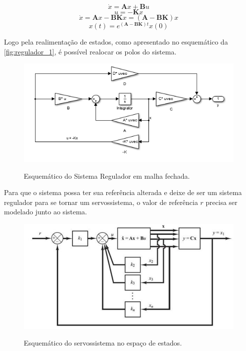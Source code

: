 \documentclass[
	article,			%
	11pt,				%
	oneside,			%
	a4paper,			%
	english,			%
	brazil,				%
	sumario=tradicional
	]{abntex2}
\begin{document}
$$
\dot x = \textbf{A}x + \textbf{B}u
$$
$$
u = -\textbf{K}x
$$
$$
\dot x = \textbf{A}x - \textbf{B}\textbf{K}x = (\textbf{A} - \textbf{B}\textbf{K})x
$$
$$
x(t)=e^{(\textbf{A}-\textbf{BK})t}x(0)
$$

Logo pela realimentação de estados, como apresentado no esquemático da \autoref{fig:regulador_1}, é possível realocar os polos do sistema.

\begin{figure}[htb!]
	\centering
	\caption{Esquemático do Sistema Regulador em malha fechada.}
	\includegraphics[scale=1]{./img/regulador_1.PNG}
	\label{fig:regulador_1}
\end{figure}

\pagebreak

Para que o sistema possa ter sua referência alterada e deixe de ser um sistema regulador para se tornar um servossistema, o valor de referência $r$ precisa ser modelado junto ao sistema.

\begin{figure}[htb!]
	\centering
	\caption{Esquemático do servossistema no espaço de estados.}
	\includegraphics[scale=0.8]{./img/servossitema.PNG}
	\label{fig:servossitema}
\end{figure}
\end{document}
